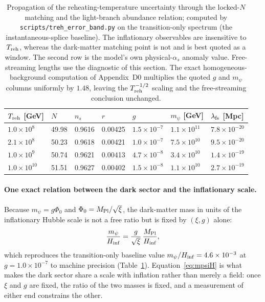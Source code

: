 \documentclass[pdflatex,sn-mathphys-num]{sn-jnl}
\newcommand{\MP}{M_{\rm Pl}}
\newcommand{\PhiV}{\Phi_0}
\theoremstyle{thmstyleone}
\begin{document}
\begin{table}[t]
\centering
\caption{Propagation of the reheating-temperature uncertainty through the locked-$N$ matching and the light-branch abundance relation; computed by \texttt{scripts/treh\_error\_band.py} on the transition-only spectrum (the instantaneous-splice baseline). The inflationary observables are insensitive to $T_{\rm reh}$, whereas the dark-matter matching point is not and is best quoted as a window. The second row is the model's own physical-$\alpha_s$ anomaly value. Free-streaming lengths use the diagnostic of this section. The exact homogeneous-background computation of Appendix~D0 multiplies the quoted $g$ and $m_\psi$ columns uniformly by $1.48$, leaving the $T_{\rm reh}^{-1/2}$ scaling and the free-streaming conclusion unchanged.}
\label{tab:trehband}
\begin{tabular}{l|l|l|l|l|l|l}
$T_{\rm reh}$ [GeV] & $N$ & $n_s$ & $r$ & $g$ & $m_\psi$ [GeV] & $\lambda_{\rm fs}$ [Mpc] \\
\hline
$1.0\times10^{8}$ & 49.98 & 0.9616 & 0.00425 & $1.5\times10^{-7}$ & $1.1\times10^{11}$ & $7.8\times10^{-20}$ \\
$2.1\times10^{8}$ & 50.23 & 0.9618 & 0.00421 & $1.0\times10^{-7}$ & $7.5\times10^{10}$ & $9.5\times10^{-20}$ \\
$1.0\times10^{9}$ & 50.74 & 0.9621 & 0.00413 & $4.7\times10^{-8}$ & $3.4\times10^{10}$ & $1.4\times10^{-19}$ \\
$1.0\times10^{10}$ & 51.51 & 0.9627 & 0.00402 & $1.5\times10^{-8}$ & $1.1\times10^{10}$ & $2.7\times10^{-19}$ \\
\end{tabular}
\end{table}

\paragraph{One exact relation between the dark sector and the inflationary scale.}
Because $m_\psi=g\PhiV$ and $\PhiV=\MP/\sqrt{\xi}$, the dark-matter mass in units of the inflationary Hubble scale is not a free ratio but is fixed by $(\xi,g)$ alone:
\begin{equation}
\frac{m_\psi}{H_{\rm inf}}=\frac{g}{\sqrt{\xi}}\,\frac{\MP}{H_{\rm inf}},
\label{eq:mpsiH}
\end{equation}
which reproduces the transition-only baseline value $m_\psi/H_{\rm inf}=4.6\times10^{-3}$ at $g=1.0\times10^{-7}$ to machine precision (Table~\ref{tab:trehband}). Equation~\eqref{eq:mpsiH} is what makes the dark sector share a scale with inflation rather than merely a field: once $\xi$ and $g$ are fixed, the ratio of the two masses is fixed, and a measurement of either end constrains the other.
\end{document}
